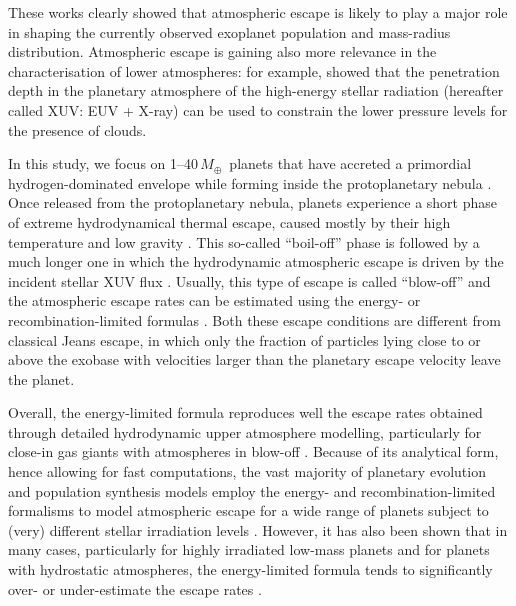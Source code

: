 \documentclass{aa}
\def\Me{\ensuremath{M_{\oplus}}}
\begin{document}
These works \citep[see also e.g.,][]{lundkvist2016} clearly showed
that atmospheric escape {is likely to play} a major role in
shaping the currently observed exoplanet population and
mass-radius distribution. Atmospheric escape is gaining also more
relevance in the characterisation of lower atmospheres: for
example, \citet{cubillos2017b} showed that the penetration depth
in the planetary atmosphere of the high-energy stellar radiation
(hereafter called XUV: EUV + X-ray) can be used to constrain the
lower pressure levels for the presence of clouds.

In this study, we focus on {1--40\,\Me\ planets that} have
accreted a primordial hydrogen-dominated envelope while forming
inside the protoplanetary nebula \citep[see e.g.,][]{stokl2016}.
Once released from the protoplanetary nebula, planets experience a
short phase of extreme hydrodynamical thermal escape, caused
mostly by their high temperature and low gravity
\citep{stokl2015,owen2016b,ginzburg2016,fossati2017}. This
so-called ``boil-off'' phase is followed by a much longer one in
which the hydrodynamic atmospheric escape is driven by the
incident stellar XUV flux \citep[e.g.,][]{lammer2003}. Usually,
this type of escape is called ``blow-off'' and the atmospheric
escape rates can be estimated using the energy- or
recombination-limited formulas
\citep{watson1981,Lecavelier2004,erkaev2007,lammer2009,ehrenreich2011,salz2016,chen2016}.
Both these escape conditions are different from classical Jeans
escape, in which only the fraction of particles lying close to or
above the exobase with velocities larger than the planetary escape
velocity leave the planet.

Overall, the energy-limited formula reproduces well the escape
rates obtained through detailed hydrodynamic upper atmosphere
modelling, particularly for close-in gas giants with atmospheres
in blow-off
\citep[e.g.,][]{lammer2009,fossati2015,salz2016,erkaev2016,erkaev2017}.
Because of its analytical form, hence allowing for fast
computations, the vast majority of planetary evolution and
population synthesis models employ the energy- and
recombination-limited formalisms to model atmospheric escape for a
wide range of planets subject to (very) different stellar
irradiation levels
\citep[e.g.,][]{jackson2012,batygin2013,jin2014,lopez2013,owen2017,jin2017,lopez2017}.
However, it has also been shown that in many cases, particularly
for highly {irradiated low-mass planets} and for planets with
hydrostatic atmospheres, the energy-limited formula tends to
significantly over- or under-estimate the escape rates
\citep[e.g.,][]{lammer2016,erkaev2015,erkaev2016,salz2016,owen2016a,fossati2017,fossati2018}.
\end{document}
